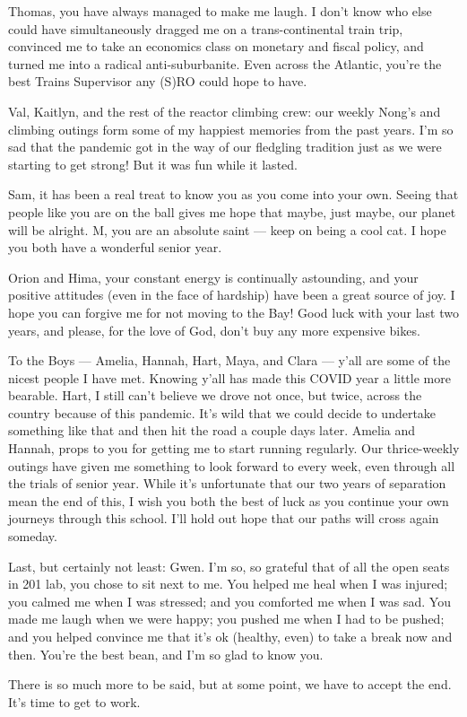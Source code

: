 \documentclass[../thesis.tex]{subfiles}
\begin{document}
	Thomas, you have always managed to make me laugh. I don't know who else could have simultaneously dragged me on a trans-continental train trip, convinced me to take an economics class on monetary and fiscal policy, and turned me into a radical anti-suburbanite. Even across the Atlantic, you're the best Trains Supervisor any (S)RO could hope to have.

	Val, Kaitlyn, and the rest of the reactor climbing crew: our weekly Nong's and climbing outings form some of my happiest memories from the past years. I'm so sad that the pandemic got in the way of our fledgling tradition just as we were starting to get strong! But it was fun while it lasted.

	Sam, it has been a real treat to know you as you come into your own. Seeing that people like you are on the ball gives me hope that maybe, just maybe, our planet will be alright. M, you are an absolute saint --- keep on being a cool cat. I hope you both have a wonderful senior year.

	Orion and Hima, your constant energy is continually astounding, and your positive attitudes (even in the face of hardship) have been a great source of joy. I hope you can forgive me for not moving to the Bay! Good luck with your last two years, and please, for the love of God, don't buy any more expensive bikes.

	To the Boys --- Amelia, Hannah, Hart, Maya, and Clara --- y'all are some of the nicest people I have met. Knowing y'all has made this COVID year a little more bearable. Hart, I still can't believe we drove not once, but twice, across the country because of this pandemic. It's wild that we could decide to undertake something like that and then hit the road a couple days later. Amelia and Hannah, props to you for getting me to start running regularly. Our thrice-weekly outings have given me something to look forward to every week, even through all the trials of senior year. While it's unfortunate that our two years of separation mean the end of this, I wish you both the best of luck as you continue your own journeys through this school. I'll hold out hope that our paths will cross again someday.

	Last, but certainly not least: Gwen. I'm so, so grateful that of all the open seats in 201 lab, you chose to sit next to me. You helped me heal when I was injured; you calmed me when I was stressed; and you comforted me when I was sad. You made me laugh when we were happy; you pushed me when I had to be pushed; and you helped convince me that it's ok (healthy, even) to take a break now and then. You're the best bean, and I'm so glad to know you.

	There is so much more to be said, but at some point, we have to accept the end. It's time to get to work.
\end{document}
